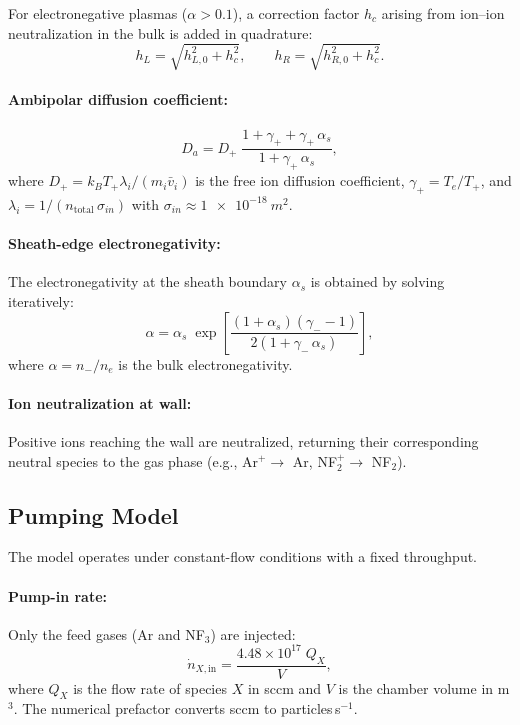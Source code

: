 \documentclass[11pt,a4paper]{article}
\newcommand{\Te}{\ensuremath{T_e}}
\renewcommand{\ne}{\ensuremath{n_e}}
\begin{document}
For electronegative plasmas ($\alpha > 0.1$), a correction factor $h_c$ arising
from ion--ion neutralization in the bulk is added in quadrature:
\begin{equation}
  \label{eq:hc}
  h_{L} = \sqrt{h_{L,0}^2 + h_c^2}, \qquad
  h_{R} = \sqrt{h_{R,0}^2 + h_c^2}.
\end{equation}

\paragraph{Ambipolar diffusion coefficient:}
\begin{equation}
  \label{eq:Da}
  D_a = D_+\;\frac{1 + \gamma_+ + \gamma_+\,\alpha_s}{1 + \gamma_+\,\alpha_s},
\end{equation}
where $D_+ = k_BT_+\lambda_i/(m_i\bar{v}_i)$ is the free ion diffusion
coefficient, $\gamma_+ = \Te/T_+$, and $\lambda_i =
1/(n_{\text{total}}\,\sigma_{in})$ with $\sigma_{in} \approx
\SI{1e-18}{m^2}$.

\paragraph{Sheath-edge electronegativity:}
The electronegativity at the sheath boundary $\alpha_s$ is obtained by solving
iteratively:
\begin{equation}
  \label{eq:alpha_s}
  \alpha = \alpha_s\;\exp\!\left[
    \frac{(1+\alpha_s)(\gamma_- - 1)}{2(1+\gamma_-\,\alpha_s)}
  \right],
\end{equation}
where $\alpha = n_-/\ne$ is the bulk electronegativity.

\paragraph{Ion neutralization at wall:}
Positive ions reaching the wall are neutralized, returning their corresponding
neutral species to the gas phase (e.g., Ar$^+ \to$ Ar, NF$_2^+ \to$ NF$_2$).


\subsection{Pumping Model}
\label{sec:pumping}

The model operates under constant-flow conditions with a fixed throughput.

\paragraph{Pump-in rate:}
Only the feed gases (Ar and NF$_3$) are injected:
\begin{equation}
  \label{eq:pump_in}
  \dot{n}_{X,\text{in}} = \frac{4.48 \times 10^{17}\;Q_X}{V},
\end{equation}
where $Q_X$ is the flow rate of species $X$ in sccm and $V$ is the chamber
volume in m$^3$. The numerical prefactor converts sccm to particles\,s$^{-1}$.
\end{document}
